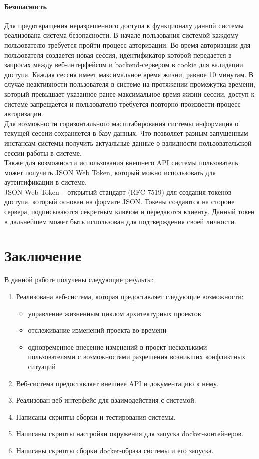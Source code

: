 \documentclass[a4paper,14pt]{extreport} %
\begin{document}
\subsubsection{Безопасность}

Для предотвращения неразрешенного доступа к функционалу данной системы реализована система безопасности. В начале пользования системой каждому пользователю требуется пройти процесс авторизации. Во время авторизации для пользователя создается новая сессия, идентификатор которой передается в запросах между веб-интерфейсом и backend-сервером в cookie для валидации доступа. Каждая сессия имеет максимальное время жизни, равное 10 минутам. В случае неактивности пользователя в системе на протяжении промежутка времени, который превышает указанное ранее максимальное время жизни сессии, доступ к системе запрещается и пользователю требуется повторно произвести процесс авторизации. \\
Для возможности горизонтального масштабирования системы информация о текущей сессии сохраняется в базу данных. Что позволяет разным запущенным инстансам системы получить актуальные данные о валидности пользовательской сессии работы в системе. \\
Также для возможности использования внешнего API системы пользователь может получить JSON Web Token, который можно использовать для аутентификации в системе. \\
JSON Web Token -- открытый стандарт (RFC 7519) для создания токенов доступа, который основан на формате JSON. Токены создаются на стороне сервера, подписываются секретным ключом и передаются клиенту. Данный токен в дальнейшем может быть использован для подтверждения своей личности.

\newpage
\chapter{Заключение}

В данной работе получены следующие результы:
\begin{enumerate}
\item Реализована  веб-система, которая предоставляет следующие возможности:
\begin{itemize}
\item управление жизненным циклом архитектурных проектов
\item отслеживание изменений проекта во времени
\item одновременное внесение изменений в проект несколькими пользователями с возможностями разрешения возникших конфликтных ситуаций
\end{itemize}
\item Веб-система предоставляет внешнее API и документацию к нему.
\item Реализован веб-интерфейс для взаимодействия с системой.
\item Написаны скрипты сборки и тестирования системы.
\item Написаны скрипты настройки окружения для запуска docker-контейнеров.
\item Написаны скрипты сборки docker-образа системы и его запуска.
\end{enumerate}
\end{document}
